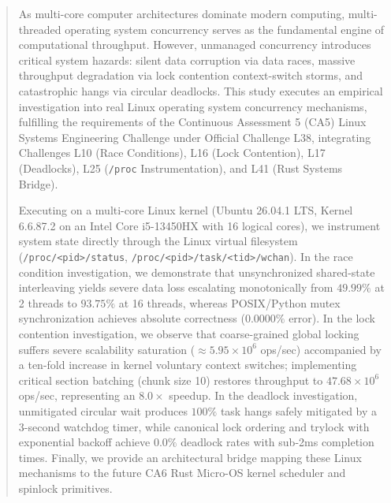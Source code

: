 \documentclass[11pt,a4paper]{article}
\begin{document}
\newpage
\tableofcontents
\newpage

\begin{abstract}
As multi-core computer architectures dominate modern computing, multi-threaded operating system concurrency serves as the fundamental engine of computational throughput. However, unmanaged concurrency introduces critical system hazards: silent data corruption via data races, massive throughput degradation via lock contention context-switch storms, and catastrophic hangs via circular deadlocks. This study executes an empirical investigation into real Linux operating system concurrency mechanisms, fulfilling the requirements of the Continuous Assessment 5 (CA5) Linux Systems Engineering Challenge under Official Challenge L38, integrating Challenges L10 (Race Conditions), L16 (Lock Contention), L17 (Deadlocks), L25 (\texttt{/proc} Instrumentation), and L41 (Rust Systems Bridge). 

Executing on a multi-core Linux kernel (Ubuntu 26.04.1 LTS, Kernel 6.6.87.2 on an Intel Core i5-13450HX with 16 logical cores), we instrument system state directly through the Linux virtual filesystem (\texttt{/proc/<pid>/status}, \texttt{/proc/<pid>/task/<tid>/wchan}). In the race condition investigation, we demonstrate that unsynchronized shared-state interleaving yields severe data loss escalating monotonically from $49.99\%$ at 2 threads to $93.75\%$ at 16 threads, whereas POSIX/Python mutex synchronization achieves absolute correctness ($0.0000\%$ error). In the lock contention investigation, we observe that coarse-grained global locking suffers severe scalability saturation ($\approx 5.95 \times 10^6$ ops/sec) accompanied by a ten-fold increase in kernel voluntary context switches; implementing critical section batching (chunk size 10) restores throughput to $47.68 \times 10^6$ ops/sec, representing an $8.0\times$ speedup. In the deadlock investigation, unmitigated circular wait produces $100\%$ task hangs safely mitigated by a 3-second watchdog timer, while canonical lock ordering and trylock with exponential backoff achieve $0.0\%$ deadlock rates with sub-2ms completion times. Finally, we provide an architectural bridge mapping these Linux mechanisms to the future CA6 Rust Micro-OS kernel scheduler and spinlock primitives.
\end{abstract}

\end{document}
